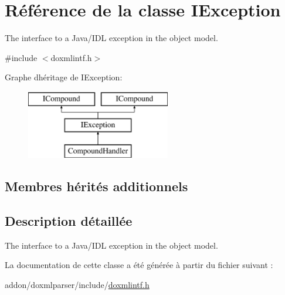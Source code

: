 \hypertarget{class_i_exception}{}\section{Référence de la classe I\+Exception}
\label{class_i_exception}


The interface to a Java/\+I\+D\+L exception in the object model.  




{\ttfamily \#include $<$doxmlintf.\+h$>$}

Graphe d\textquotesingle{}héritage de I\+Exception\+:\begin{figure}[H]
\begin{center}
\leavevmode
\includegraphics[height=3.000000cm]{class_i_exception}
\end{center}
\end{figure}
\subsection*{Membres hérités additionnels}


\subsection{Description détaillée}
The interface to a Java/\+I\+D\+L exception in the object model. 

La documentation de cette classe a été générée à partir du fichier suivant \+:\begin{DoxyCompactItemize}
\item 
addon/doxmlparser/include/\hyperlink{include_2doxmlintf_8h}{doxmlintf.\+h}\end{DoxyCompactItemize}

